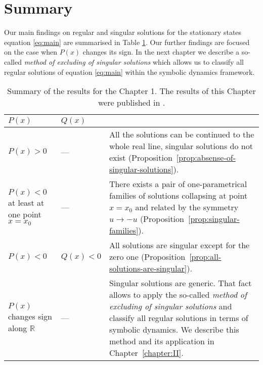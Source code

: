 \section{Summary}

Our main findings on regular and singular solutions for the stationary states equation \eqref{eq:main} are summarised in Table \ref{tab:first-chapter-results}.
Our further findings are focused on the case when $P(x)$ changes its sign.
In the next chapter we describe a so-called {\it method of excluding of singular solutions} which allows us to classify all regular solutions of equation \eqref{eq:main} within the symbolic dynamics framework.

\begin{table}[h!]
	\centering
	\begin{tabular}{ | p{4cm} | l || p{10cm} | }
		\hline
		$P(x)$ & $Q(x)$ & \\
		\hline
		$P(x) > 0$ & --- & All the solutions can be continued to the whole real line, singular solutions do not exist (Proposition~\ref{prop:absense-of-singular-solutions}). \\
		\hline
		$P(x) < 0$ at least at one point $x = x_0$ & --- & There exists a pair of one-parametrical families of solutions collapsing at point $x = x_0$ and related by the symmetry $u \to -u$ (Proposition~\ref{prop:singular-families}). \\
		\hline
		$P(x) < 0$ & $Q(x) < 0$ & All solutions are singular except for the zero one (Proposition~\ref{prop:all-solutions-are-singular}). \\
		\hline
		$P(x)$ changes sign along $\mathbb{R}$ & --- & Singular solutions are generic.
		That fact allows to apply the so-called {\it method of excluding of singular solutions} and classify all regular solutions in terms of symbolic dynamics.
		We describe this method and its application in Chapter~\ref{chapter:II}. \\
		\hline
	\end{tabular}
	\caption{
		Summary of the results for the Chapter 1.
		The results of this Chapter were published in \cite{AlfimovLebedev}.
	}
	\label{tab:first-chapter-results}
\end{table}
